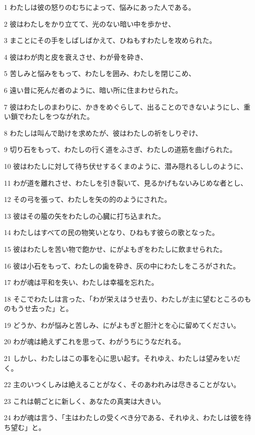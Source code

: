 \par 1 わたしは彼の怒りのむちによって、悩みにあった人である。
\par 2 彼はわたしをかり立てて、光のない暗い中を歩かせ、
\par 3 まことにその手をしばしばかえて、ひねもすわたしを攻められた。
\par 4 彼はわが肉と皮を衰えさせ、わが骨を砕き、
\par 5 苦しみと悩みをもって、わたしを囲み、わたしを閉じこめ、
\par 6 遠い昔に死んだ者のように、暗い所に住まわせられた。
\par 7 彼はわたしのまわりに、かきをめぐらして、出ることのできないようにし、重い鎖でわたしをつながれた。
\par 8 わたしは叫んで助けを求めたが、彼はわたしの祈をしりぞけ、
\par 9 切り石をもって、わたしの行く道をふさぎ、わたしの道筋を曲げられた。
\par 10 彼はわたしに対して待ち伏せするくまのように、潜み隠れるししのように、
\par 11 わが道を離れさせ、わたしを引き裂いて、見るかげもないみじめな者とし、
\par 12 その弓を張って、わたしを矢の的のようにされた。
\par 13 彼はその箙の矢をわたしの心臓に打ち込まれた。
\par 14 わたしはすべての民の物笑いとなり、ひねもす彼らの歌となった。
\par 15 彼はわたしを苦い物で飽かせ、にがよもぎをわたしに飲ませられた。
\par 16 彼は小石をもって、わたしの歯を砕き、灰の中にわたしをころがされた。
\par 17 わが魂は平和を失い、わたしは幸福を忘れた。
\par 18 そこでわたしは言った、「わが栄えはうせ去り、わたしが主に望むところのものもうせ去った」と。
\par 19 どうか、わが悩みと苦しみ、にがよもぎと胆汁とを心に留めてください。
\par 20 わが魂は絶えずこれを思って、わがうちにうなだれる。
\par 21 しかし、わたしはこの事を心に思い起す。それゆえ、わたしは望みをいだく。
\par 22 主のいつくしみは絶えることがなく、そのあわれみは尽きることがない。
\par 23 これは朝ごとに新しく、あなたの真実は大きい。
\par 24 わが魂は言う、「主はわたしの受くべき分である、それゆえ、わたしは彼を待ち望む」と。

